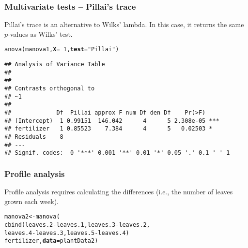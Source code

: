 \documentclass[color=usenames,dvipsnames]{beamer}\usepackage[]{graphicx}\usepackage[]{color}
\makeatletter
\newcommand{\hlnum}[1]{\textcolor[rgb]{0.69,0.494,0}{#1}}%
\newcommand{\hlstr}[1]{\textcolor[rgb]{0.749,0.012,0.012}{#1}}%
\newcommand{\hlopt}[1]{\textcolor[rgb]{0,0,0}{#1}}%
\newcommand{\hlstd}[1]{\textcolor[rgb]{0,0,0}{#1}}%
\newcommand{\hlkwb}[1]{\textcolor[rgb]{0,0.341,0.682}{#1}}%
\newcommand{\hlkwc}[1]{\textcolor[rgb]{0,0,0}{\textbf{#1}}}%
\newcommand{\hlkwd}[1]{\textcolor[rgb]{0.004,0.004,0.506}{#1}}%
\newenvironment{kframe}{%
 \def\at@end@of@kframe{}%
 \ifinner\ifhmode%
  \def\at@end@of@kframe{\end{minipage}}%
  \begin{minipage}{\columnwidth}%
 \fi\fi%
 \def\FrameCommand##1{\hskip\@totalleftmargin \hskip-\fboxsep
 \colorbox{shadecolor}{##1}\hskip-\fboxsep
     \hskip-\linewidth \hskip-\@totalleftmargin \hskip\columnwidth}%
 \MakeFramed {\advance\hsize-\width
   \@totalleftmargin\z@ \linewidth\hsize
   \@setminipage}}%
 {\par\unskip\endMakeFramed%
 \at@end@of@kframe}
\newenvironment{knitrout}{}{} %
\makeatother
\begin{document}
\begin{frame}[fragile]
  \frametitle{Multivariate tests -- Pillai's trace}
  \small
  {%
    Pillai's trace is an alternative to Wilks' lambda. In this
    case, it returns the same $p$-values as Wilks' test.}
  \vfill
  \footnotesize
\begin{knitrout}\footnotesize
{}\color{fgcolor}\begin{kframe}
\begin{alltt}
\hlkwd{anova}\hlstd{(manova1,} \hlkwc{X}\hlstd{=}\hlopt{~}\hlnum{1}\hlstd{,} \hlkwc{test}\hlstd{=}\hlstr{"Pillai"}\hlstd{)}
\end{alltt}
\begin{verbatim}
## Analysis of Variance Table
## 
## 
## Contrasts orthogonal to
## ~1
## 
##             Df  Pillai approx F num Df den Df    Pr(>F)    
## (Intercept)  1 0.99151  146.042      4      5 2.308e-05 ***
## fertilizer   1 0.85523    7.384      4      5   0.02503 *  
## Residuals    8                                             
## ---
## Signif. codes:  0 '***' 0.001 '**' 0.01 '*' 0.05 '.' 0.1 ' ' 1
\end{verbatim}
\end{kframe}
\end{knitrout}

\end{frame}












\begin{frame}[fragile]
  \frametitle{Profile analysis}
  {%
    Profile analysis requires calculating the differences (i.e., the 
    number of leaves grown each week).}
  \vspace{1cm}
  \footnotesize
\begin{knitrout}\footnotesize
{}\color{fgcolor}\begin{kframe}
\begin{alltt}
\hlstd{manova2} \hlkwb{<-} \hlkwd{manova}\hlstd{(}
    \hlkwd{cbind}\hlstd{(leaves.2}\hlopt{-}\hlstd{leaves.1, leaves.3}\hlopt{-}\hlstd{leaves.2,}
          \hlstd{leaves.4}\hlopt{-}\hlstd{leaves.3, leaves.5}\hlopt{-}\hlstd{leaves.4)} \hlopt{~}
    \hlstd{fertilizer,} \hlkwc{data}\hlstd{=plantData2)}
\end{alltt}
\end{kframe}
\end{knitrout}
\end{frame}
\end{document}
